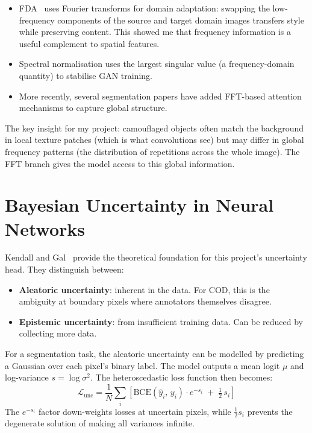 \documentclass[12pt,a4paper]{report}
\begin{document}
\begin{itemize}
  \item FDA~\cite{yang2020fda} uses Fourier transforms for domain adaptation: swapping the low-frequency components of the source and target domain images transfers style while preserving content. This showed me that frequency information is a useful complement to spatial features.
  \item Spectral normalisation uses the largest singular value (a frequency-domain quantity) to stabilise GAN training.
  \item More recently, several segmentation papers have added FFT-based attention mechanisms to capture global structure.
\end{itemize}

The key insight for my project: camouflaged objects often match the background in local texture patches (which is what convolutions see) but may differ in global frequency patterns (the distribution of repetitions across the whole image). The FFT branch gives the model access to this global information.

\section{Bayesian Uncertainty in Neural Networks}

Kendall and Gal~\cite{kendall2017uncertainties} provide the theoretical foundation for this project's uncertainty head. They distinguish between:
\begin{itemize}
  \item \textbf{Aleatoric uncertainty}: inherent in the data. For COD, this is the ambiguity at boundary pixels where annotators themselves disagree.
  \item \textbf{Epistemic uncertainty}: from insufficient training data. Can be reduced by collecting more data.
\end{itemize}

For a segmentation task, the aleatoric uncertainty can be modelled by predicting a Gaussian over each pixel's binary label. The model outputs a mean logit $\mu$ and log-variance $s = \log\sigma^2$. The heteroscedastic loss function then becomes:
\begin{equation}
  \mathcal{L}_{\text{unc}} = \frac{1}{N}\sum_{i}\left[
    \text{BCE}(\hat{y}_i,\, y_i)\cdot e^{-s_i} \;+\; \tfrac{1}{2}\,s_i
  \right]
\end{equation}
The $e^{-s_i}$ factor down-weights losses at uncertain pixels, while $\tfrac{1}{2}s_i$ prevents the degenerate solution of making all variances infinite.
\end{document}
